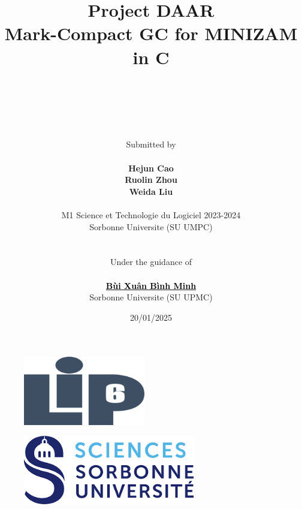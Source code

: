 \documentclass[11pt,english]{article}
\begin{document}
\title
{
    \textbf{Project DAAR \\ Mark-Compact GC for MINIZAM in C\\}
}

\author
{
    \\
    \\
    \\
    \\
    \\
    Submitted by
    \\
    \\
    \textbf{Hejun Cao}
    \\
    \textbf{Ruolin Zhou}
    \\
    \textbf{Weida Liu}
    \\
    \\
    M1 Science et Technologie du Logiciel 2023-2024
    \\
    Sorbonne Universite (SU UMPC)
    \\
    \\
    \\
    Under the guidance of 
    \\
    \\
    \textbf{\href{https://www-npa.lip6.fr/~buixuan/}{\textcolor{black}{Bùi Xuân Bình Minh}}}
    \\
    Sorbonne Universite (SU UPMC)
}

\date{20/01/2025}

\maketitle

\begin{figure}[h]
    \begin{center}
        \includegraphics[height=3cm]{./src/logo_lip6.png}
    \end{center}
\end{figure}

\begin{figure}[h]
    \begin{center}
        \includegraphics[height=3cm]{./src/Science_Sorbonne_logo.png}
    \end{center}
\end{figure}
\end{document}
